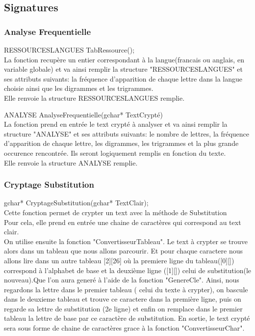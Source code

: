 \documentclass[a4]{article}
\begin{document}
		\subsection{Signatures}
		
	
	\subsubsection{Analyse Frequentielle}
	RESSOURCESLANGUES TabRessource();\\
		La fonction recupère un entier correspondant à la langue(francais ou anglais, en variable globale)
		et va ainsi remplir la structure "RESSOURCESLANGUES" et ses attributs suivants:
		la fréquence d'apparition de chaque lettre dans la langue choisie ainsi que les digrammes
		et les trigrammes.\\
		Elle renvoie la structure RESSOURCESLANGUES remplie.
		
	ANALYSE AnalyseFrequentielle(gchar* TextCrypté)\\
		La fonction prend en entrée le text crypté à analyser et va ainsi remplir la structure "ANALYSE" et 
		ses attributs suivants:
		le nombre de lettres, la fréquence d'apparition de chaque lettre, les digrammes, les trigrammes
		et la plus grande occurence rencontrée. Ils seront logiquement remplis en fonction du texte.\\
		Elle renvoie la structure ANALYSE remplie.
		
	\subsubsection{Cryptage Substitution}
	gchar* CryptageSubstitution(gchar* TextClair);\\
		Cette fonction permet de crypter un text avec la méthode de Substitution\\
		Pour cela, elle prend en entrée une chaine de caractères qui correspond au text clair.\\
		On utilise ensuite la fonction "ConvertisseurTableau".
		Le text à crypter se trouve alors dans un tableau que nous allons parcourir. Et pour chaque caractere 
		nous allons lire dans un autre tableau [2][26] où la premiere ligne du tableau([0][]) correspond à l'alphabet
		de base et la deuxième ligne ([1][]) celui de substitution(le nouveau).Que l'on aura generé à l'aide de la fonction "GenereCle". Ainsi, nous regardons la lettre dans 
		le premier tableau ( celui du texte à crypter), on bascule dans le deuxieme tableau et trouve ce caractere dans la première ligne, puis on regarde sa lettre de substitution (2e ligne) et enfin on remplace dans le premier tableau 
		la lettre de base par ce caractère de substitution. En sortie, le text crypté sera sous forme de chaine de caractères grace à la fonction "ConvertisseurChar".
		
\end{document}
